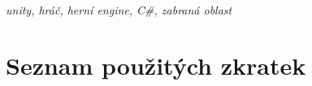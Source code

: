 \documentclass[12pt,a4paper]{report}
\begin{document}
\emph{unity, hráč, herní engine, C\#, zabraná oblast}





\newpage


\setcounter{page}{5}


\begingroup
\makeatletter
\def\@makeschapterhead#1{%
  {\parindent \z@ \raggedright
    \normalfont
    \interlinepenalty\@M
    \Huge \sffamily \bfseries  #1\par\nobreak
    \vskip 40\p@
  }}
\makeatother

\tableofcontents
\endgroup

\begingroup
\makeatletter
\def\@makeschapterhead#1{%
  {\parindent \z@ \raggedright
    \normalfont
    \interlinepenalty\@M
    \Huge \sffamily \bfseries  #1\par\nobreak
    \vskip 40\p@
  }}
\makeatother

\listoffigures
\endgroup


\chapter*{Seznam použitých zkratek}
\end{document}
